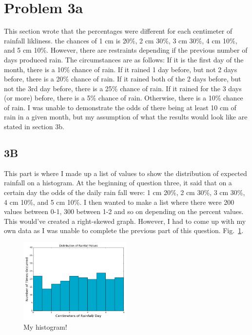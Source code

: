 \documentclass[twocolumn]{revtex4}
\begin{document}
\section{Problem 3a}

This section wrote that the percentages were different for each centimeter of rainfall likliness. the chances of 1 cm is 20\%,  2 cm 30\%, 3 cm 30\%, 4 cm 10\%, and 5 cm 10\%. However, there are restraints depending if the previous number of days produced rain. The circumstances are as follows: 
If it is the first day of the month, there is a 10\% chance of rain.
If it rained 1 day before, but not 2 days before, there is a 20\% chance of rain.
If it rained both of the 2 days before, but not the 3rd day before, there is a 25\% chance of rain.
If it rained for the 3 days (or more) before, there is a 5\% chance of rain.
Otherwise, there is a 10\% chance of rain. I was unable to demonstrate the odds of there being at least 10 cm of rain in a given month, but my assumption of what the results would look like are stated in section 3b.


\subsection{3B}

This part is where I made up a list of values to show the distribution of expected rainfall on a histogram. At the beginning of question three, it said that on a certain day the odds of the daily rain fall were: 1 cm 20\%, 2 cm 30\%, 3 cm 30\%, 4 cm 10\%, and 5 cm 10\%. I then wanted to make a list where there were 200 values between 0-1, 300 between 1-2 and so on depending on the percent values. This would've created a right-skewed graph. However, I had to come up with my own data as I was unable to complete the previous part of this question.  Fig.~\ref{graph}.
\begin{figure}[!h]

\centering
\includegraphics[width=0.5\textwidth]{graph.png}
\caption{My histogram! \label{graph}}


\end{figure}
\end{document}
